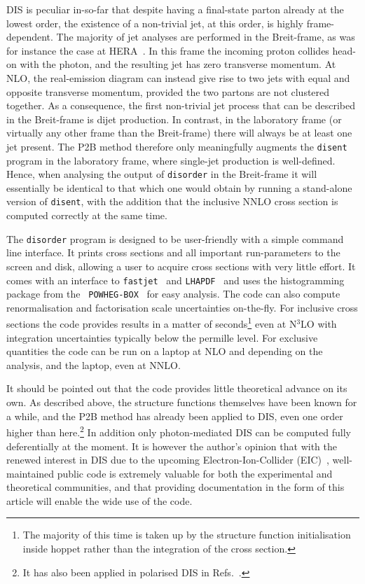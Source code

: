 \documentclass[submission, PhysCodeb]{SciPost_better_arXiv}
\newcommand{\hoppet}{{\sc hoppet}}
\newcommand{\disent}{{\tt disent}}
\newcommand{\disorder}{{\tt disorder}}
\newcommand{\fastjet}{{\tt fastjet}}
\newcommand{\lhapdf}{{\tt LHAPDF}}
\newcommand{\NNNLO}{N$^3$LO}
\begin{document}
DIS is peculiar in-so-far that despite having a final-state parton
already at the lowest order, the existence of a non-trivial jet, at
this order, is highly frame-dependent. The majority of jet analyses
are performed in the Breit-frame, as was for instance the case at
HERA~\cite{ZEUS:2006xvn,H1:2009pqp,ZEUS:2010vyw,H1:2014cbm,Baghdasaryan:2015yha,H1:2016goa}. In
this frame the incoming proton collides head-on with the photon, and
the resulting jet has zero transverse momentum. At NLO, the
real-emission diagram can instead give rise to two jets with equal and
opposite transverse momentum, provided the two partons are not
clustered together. As a consequence, the first non-trivial jet
process that can be described in the Breit-frame is dijet
production. In contrast, in the laboratory frame (or virtually any
other frame than the Breit-frame) there will always be at least one
jet present. The P2B method therefore only meaningfully augments the
\disent{} program in the laboratory frame, where single-jet production
is well-defined. Hence, when analysing the output of \disorder{} in
the Breit-frame it will essentially be identical to that which one
would obtain by running a stand-alone version of \disent{}, with the
addition that the inclusive NNLO cross section is computed correctly
at the same time.

The \disorder{} program is designed to be user-friendly with a simple
command line interface. It prints cross sections and all important
run-parameters to the screen and disk, allowing a user to acquire
cross sections with very little effort. It comes with an interface to
\fastjet{}~\cite{Cacciari:2011ma} and \lhapdf{}~\cite{Buckley:2014ana}
and uses the histogramming package from the {\tt
  POWHEG-BOX}~\cite{Alioli:2010xd} for easy analysis. The code can
also compute renormalisation and factorisation scale uncertainties
on-the-fly. For inclusive cross sections the code provides results in
a matter of seconds\footnote{The majority of this time is taken up by
the structure function initialisation inside \hoppet{} rather than the
integration of the cross section.} even at \NNNLO{} with integration
uncertainties typically below the permille level. For exclusive
quantities the code can be run on a laptop at NLO and depending on the
analysis, and the laptop, even at NNLO.

It should be pointed out that the code provides little theoretical
advance on its own. As described above, the structure functions
themselves have been known for a while, and the P2B method has already
been applied to DIS, even one order higher than here.\footnote{It has
also been applied in polarised DIS in
Refs.~\cite{Borsa:2020ulb,Borsa:2020yxh,Borsa:2021afb,Borsa:2022irn,Borsa:2022cap}.}
In addition only photon-mediated DIS can be computed fully
deferentially at the moment. It is however the author's opinion that
with the renewed interest in DIS due to the upcoming
Electron-Ion-Collider (EIC)~\cite{AbdulKhalek:2022hcn},
well-maintained public code is extremely valuable for both the
experimental and theoretical communities, and that providing
documentation in the form of this article will enable the wide use of
the code.
\end{document}
